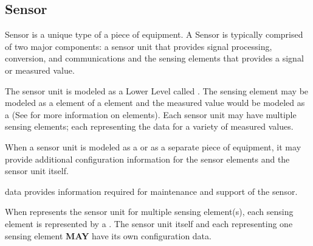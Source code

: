 \subsection{Sensor} \label{sec:Sensor}


\gls{Sensor} is a unique type of a piece of equipment.  A \gls{Sensor} is typically comprised of two major components: a \gls{sensor unit} that provides signal processing, conversion, and communications and the \glspl{sensing element} that provides a signal or measured value.

The \gls{sensor unit} is modeled as a \gls{Lower Level}  called .  The \gls{sensing element} may be modeled as a  element of a  element and the measured value would be modeled as a  (See  for more information on  elements).  Each \gls{sensor unit} may have multiple \glspl{sensing element}; each representing the data for a variety of measured values.

When a \gls{sensor unit} is modeled as a  or as a separate piece of equipment, it may provide additional configuration information for the \glspl{sensor element} and the \gls{sensor unit} itself.  

 data provides information required for maintenance and support of the sensor.

When  represents the \gls{sensor unit} for multiple \gls{sensing element}(s), each sensing element is represented by a .   The \gls{sensor unit} itself and each  representing one \gls{sensing element} \textbf{MAY} have its own configuration data.

